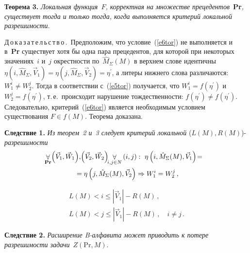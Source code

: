 \begin{multicols}{2}
\noindent
\textbf{Теорема 3.} \textit{Локальная функция~$F$, корректная на множестве 
прецедентов}~\textbf{Pr}\textit{, существует тогда и только тогда, когда 
выполняется критерий локальной разрешимости}. 

\medskip

\noindent
Д\,о\,к\,а\,з\,а\,т\,е\,л\,ь\,с\,т\,в\,о\,.\ Предположим, что условие~(\ref{e6tor}) не 
выполняется и в~\textbf{Pr} существует хотя бы одна пара прецедентов, для 
которой при некоторых значениях~$i$ и~$j$ окрестности 
по~$\hat{M}_\Sigma(M)$ в верхнем слове идентичны  $\eta (i, \hat{M}_\Sigma , 
\vec{V}_1) =\eta (j, \hat{M}_\Sigma , \vec{V}_2)=\eta^\prime$, а литеры нижнего 
слова различаются: $W_1^i\not= W_2^j$. Тогда в соответствии с~(\ref{e5tor}) 
получается, что $W_1^i=f(\eta^\prime)$ и $W_2^j=f(\eta^\prime)$, т.\,е.\ 
происходит нарушение тождественности: $f(\eta^\prime)\not=f(\eta^\prime)$. 
Следовательно, критерий~(\ref{e6tor}) является необходимым условием 
существования $F\in f(M)$. Теорема до\-ка\-зана.

\medskip

\noindent
\textbf{Следствие 1.} \textit{Из теорем~2 и~3 следует критерий локальной} 
($L(M),R(M)$)-\textit{разрешимости}
\setcounter{equation}{3}\renewcommand{\theequation}{\arabic{equation}$^\prime$}
\begin{multline*}
\!\!\!\!\!\!\forallb\limits_{\mathbf{Pr}}\! \left(\vec{V}_1,\vec{W}_1\right)\!, \!
\left(\vec{V}_2,\vec{W}_2\right)\!\! \forallb\limits_{i,j\in N} \left(i,j\right):\ \eta \left(i, 
\hat{M}_\Sigma(M), \vec{V}_1\right)\! =\hspace*{-0.80466pt}\\
{}=\eta\left( j, \hat{M}_\Sigma(M), 
\vec{V}_2\right) \Rightarrow W_1^i=W_2^j\,,
\end{multline*}
\vspace*{-12pt}

\noindent
\begin{multline}
L(M)<i\leq \left |\vec{V}_1\right | -R(M)\,,
\\
L(M)<j\leq \left | \vec{V}_1\right | -
R(M)\,,\quad i\not= j\,.
\end{multline}
\setcounter{equation}{4}\renewcommand{\theequation}{\arabic{equation}}
    
\medskip

\noindent
\textbf{Следствие 2.} \textit{Расширение B-ал\-фа\-ви\-та может приводить к 
потере разрешимости задачи}~$Z(\mathrm{Pr}, M)$. 

\medskip


\end{multicols}
